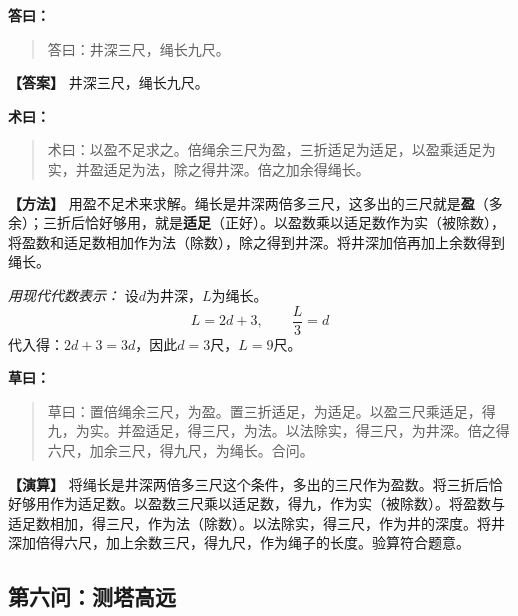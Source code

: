 \documentclass[11pt,a4paper]{article}
\newcommand{\dalabel}{\textbf{\color{origcolor}答曰：}}
\newcommand{\shulabel}{\textbf{\color{origcolor}术曰：}}
\newcommand{\caolabel}{\textbf{\color{origcolor}草曰：}}
\newcommand{\moddalabel}{\textbf{\color{modcolor}【答案】}}
\newcommand{\modshulabel}{\textbf{\color{modcolor}【方法】}}
\newcommand{\modcaolabel}{\textbf{\color{modcolor}【演算】}}
\begin{document}
\begin{originaltext}
\dalabel
\begin{quote}
\textcolor{origcolor}{%
答曰：井深三尺，绳长九尺。
}
\end{quote}
\end{originaltext}

\begin{moderntext}
\moddalabel
井深三尺，绳长九尺。
\end{moderntext}

\begin{originaltext}
\shulabel
\begin{quote}
\textcolor{origcolor}{%
术曰：以盈不足求之。倍绳余三尺为盈，三折适足为适足，以盈乘适足为实，并盈适足为法，除之得井深。倍之加余得绳长。
}
\end{quote}
\end{originaltext}

\begin{moderntext}
\modshulabel
用盈不足术来求解。绳长是井深两倍多三尺，这多出的三尺就是\textbf{盈}（多余）；三折后恰好够用，就是\textbf{适足}（正好）。以盈数乘以适足数作为实（被除数），将盈数和适足数相加作为法（除数），除之得到井深。将井深加倍再加上余数得到绳长。

\textit{用现代代数表示：} 设$d$为井深，$L$为绳长。
\[
L = 2d + 3, \qquad \frac{L}{3} = d
\]
代入得：$2d + 3 = 3d$，因此$d = 3$尺，$L = 9$尺。
\end{moderntext}

\begin{originaltext}
\caolabel
\begin{quote}
\textcolor{origcolor}{%
草曰：置倍绳余三尺，为盈。置三折适足，为适足。以盈三尺乘适足，得九，为实。并盈适足，得三尺，为法。以法除实，得三尺，为井深。倍之得六尺，加余三尺，得九尺，为绳长。合问。
}
\end{quote}
\end{originaltext}

\begin{moderntext}
\modcaolabel
将绳长是井深两倍多三尺这个条件，多出的三尺作为盈数。将三折后恰好够用作为适足数。以盈数三尺乘以适足数，得九，作为实（被除数）。将盈数与适足数相加，得三尺，作为法（除数）。以法除实，得三尺，作为井的深度。将井深加倍得六尺，加上余数三尺，得九尺，作为绳子的长度。验算符合题意。
\end{moderntext}

\subsection*{第六问：测塔高远}
\end{document}
